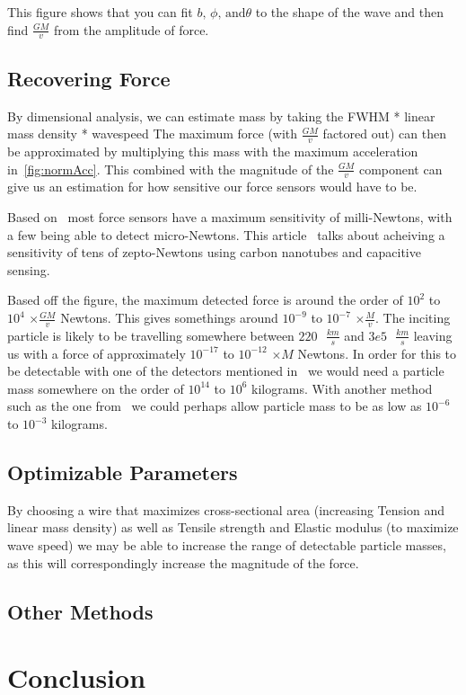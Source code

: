 \documentclass{report}
\begin{document}
This figure shows that you can fit $b \text{, } \phi \text{, and} \theta$ to the shape of the wave and then find $\frac{G M}{v}$ from the amplitude of force.

\section*{Recovering Force}
By dimensional analysis, we can estimate mass by taking the FWHM * linear mass density * wavespeed
The maximum force (with $\frac{G M}{v}$ factored out) can then be approximated by multiplying this mass with the maximum acceleration in~\ref{fig:normAcc}. This combined with 
the magnitude of the $\frac{G M}{v}$ component can give us an estimation for how sensitive our force sensors would have to be.

Based on~\cite{WEI2015359} most force sensors have a maximum sensitivity of milli-Newtons, with a few being able to detect micro-Newtons.
This article~\cite{Moser2013} talks about acheiving a sensitivity of tens of zepto-Newtons using carbon nanotubes and capacitive sensing. 

Based off the figure, the maximum detected force is around the order of $10^2$ to $10^4$ $\times \frac{G M}{v}$ Newtons. This gives somethings around $10^{-9}$ to $10^{-7}$ $\times \frac{M}{v}$. 
The inciting particle is likely to be travelling somewhere between $220 \text{ } \frac{km}{s}$ and $3e5 \text{ } \frac{km}{s}$ leaving us with a force of approximately $10^{-17}$ to $10^{-12}$ $\times M$ Newtons.
In order for this to be detectable with one of the detectors mentioned in~\cite{WEI2015359} we would need a particle mass somewhere on the order of $10^{14}$ to $10^{6}$ kilograms. 
With another method such as the one from~\cite{Moser2013} we could perhaps allow particle mass to be as low as $10^{-6}$ to $10^{-3}$ kilograms. %
\section*{Optimizable Parameters}
By choosing a wire that maximizes cross-sectional area (increasing Tension and linear mass density) as well as Tensile strength and Elastic modulus (to maximize wave speed) we may be able to increase the range of detectable 
particle masses, as this will correspondingly increase the magnitude of the force.
\section*{Other Methods}
\chapter*{Conclusion}
\printbibliography[]
\end{document}
